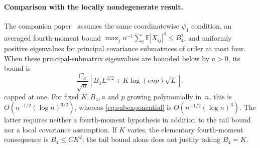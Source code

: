 \documentclass[11pt,letterpaper]{article}
\newif\ifshowskill
\newcommand{\skl}[1]{\ifshowskill{\color{revblue}%
\hypersetup{linkcolor=revblue,citecolor=revblue,urlcolor=revblue}#1}\else#1\fi}
\theoremstyle{remark}
\newcommand{\E}{\mathbb E}
\begin{document}
\paragraph{Comparison with the locally nondegenerate result.}
The companion paper~\cite[Corollary~1]{Local} assumes the same
coordinatewise \(\psi_1\) condition, an averaged fourth-moment bound
\(\max_jn^{-1}\sum_i\E|X_{ij}|^4\le B_4^2\), and uniformly positive
eigenvalues for principal covariance submatrices of order at most four.
When these principal-submatrix eigenvalues are bounded below by \(a>0\), its bound is
\[
 \frac{C_a}{\sqrt n}\left[B_4L^{3/2}
                   +K\log(enp)\sqrt L\right],
\]
capped at one. For fixed \(K,B_4,a\) and \skl{\(p\) growing polynomially in~\(n\)},
this is \(O(n^{-1/2}(\log n)^{3/2})\), whereas
\eqref{eq:subexponential} is \(O(n^{-1/2}(\log n)^3)\).
The latter requires neither a fourth-moment hypothesis in addition to
the tail bound nor a local covariance assumption. If \(K\) varies,
the elementary fourth-moment consequence is \(B_4\le C K^2\);
the tail bound alone does not justify taking \(B_4=K\).
\end{document}
